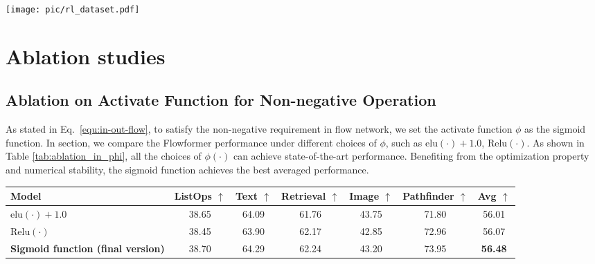 \documentclass[nohyperref]{article}
\theoremstyle{plain}
\theoremstyle{definition}
\theoremstyle{remark}
\begin{document}
\begin{figure*}[h]
\begin{center}
	\centerline{\texttt{[image: pic/rl\_dataset.pdf]}}
	\vspace{-5pt}
	\caption{HalfCheetah, Hopper and Walker environments. }
	\label{fig:rl}
\end{center}
\vspace{-20pt}
\end{figure*}

\section{Ablation studies}

\subsection{Ablation on Activate Function for Non-negative Operation}

As stated in Eq.~\eqref{equ:in-out-flow}, to satisfy the non-negative requirement in flow network, we set the activate function $\phi$ as the sigmoid function. In section, we compare the Flowformer performance under different choices of $\phi$, such as $\text{elu}(\cdot)+1.0$, $\text{Relu}(\cdot)$. As shown in Table \ref{tab:ablation_in_phi}, all the choices of $\phi(\cdot)$ can achieve state-of-the-art performance. Benefiting from the optimization property and numerical stability, the sigmoid function achieves the best averaged performance.

\begin{table*}[h]
	\caption{Ablation results on the Long-Range Arena under different choices of activate function.}
	\vspace{-5pt}
	\label{tab:ablation_in_phi}
	\vskip 0.15in
	\centering
	\begin{small}
		\begin{sc}
			\renewcommand{\multirowsetup}{\centering}
			\setlength{\tabcolsep}{4.3pt}
			\begin{tabular}{l|ccccc|c}
				\toprule
				Model & ListOps $\uparrow$ & Text $\uparrow$ & Retrieval $\uparrow$ & Image $\uparrow$ & Pathfinder $\uparrow$ & Avg $\uparrow$ \\
				\midrule
				$\text{elu}(\cdot)+1.0$ & 38.65 & 64.09 & 61.76 & 43.75 & 71.80 & 56.01 \\
				$\text{Relu}(\cdot)$ & 38.45 & 63.90 & 62.17 & 42.85 &  72.96 & 56.07 \\
				\midrule
				\textbf{Sigmoid function (final version)} & 38.70 & 64.29 & 62.24 & 43.20 & 73.95 & \textbf{56.48} \\
				\bottomrule
			\end{tabular}
		\end{sc}
	\end{small}
\end{table*}
\end{document}
